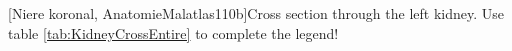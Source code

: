 	\hspace{-1cm}
	\begin{minipage}[b]{9cm}
		   [Niere koronal, AnatomieMalatlas110b]{Cross section through the left kidney. Use table \ref{tab:KidneyCrossEntire} to complete the legend!} 	\label{fig:KidneyCrossEntire}
	\vspace{0.6pt}
	\end{minipage}
	\hspace{0.5cm}
